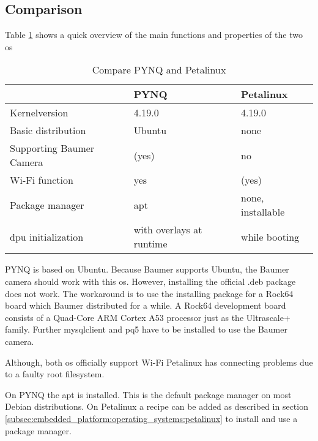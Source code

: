 \subsection{Comparison}
\label{subsec:embedded_platform:operating_systems:comparison}
Table \ref{tab:compare_os} shows a quick overview of the main functions and properties of the two \acrlong{os}

\begin{table}[hb]
  \caption{Compare PYNQ and Petalinux}
  \label{tab:compare_os}
  \centering
  \begin{tabular}{lll}
    \toprule
    \textbf{} & \textbf{PYNQ} & \textbf{Petalinux} \\
    \midrule
    Kernelversion & 4.19.0 & 4.19.0 \\
    Basic distribution & Ubuntu \cite{pynq_presentation} & none \\
    Supporting Baumer Camera & (yes) \cite{baumer_prog_guide} & no \\
    Wi-Fi function & yes & (yes) \\
    Package manager & \acrshort{apt} & none, installable \\
    \acrshort{dpu} initialization & with overlays at runtime \cite{pynq_overlays} & while booting \cite{petalinux_user_guide} \\
    \bottomrule
  \end{tabular}
\end{table}

PYNQ is based on Ubuntu.
Because Baumer supports Ubuntu, the Baumer camera should work with this \acrlong{os}.
However, installing the official .deb package does not work.
The workaround is to use the installing package for a Rock64 board which Baumer distributed for a while.
A Rock64 development board consists of a Quad-Core ARM Cortex A53 processor just as the Ultrascale+ family.
Further mysqlclient and pq5 have to be installed to use the Baumer camera.

Although, both \acrshort{os} officially support Wi-Fi Petalinux has connecting problems due to a faulty root filesystem.

On PYNQ the \acrfull{apt} is installed.
This is the default package manager on most Debian distributions.
On Petalinux a recipe can be added as described in section \ref{subsec:embedded_platform:operating_systems:petalinux} to install and use a package manager.

